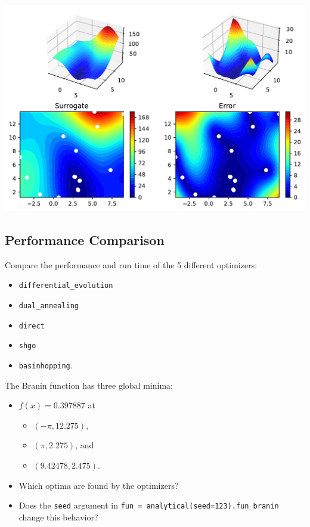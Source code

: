 \documentclass[
  letterpaper,
  DIV=11,
  numbers=noendperiod]{scrreprt}
\providecommand{\tightlist}{%
  \setlength{\itemsep}{0pt}\setlength{\parskip}{0pt}}\usepackage{longtable,booktabs,array}
\begin{document}
\begin{tcolorbox}
\includegraphics{004_spot_sklearn_optimization_files/figure-pdf/cell-12-output-3.pdf}

\end{tcolorbox}

\subsection{Performance Comparison}\label{performance-comparison}

Compare the performance and run time of the 5 different optimizers:

\begin{itemize}
\tightlist
\item
  \texttt{differential\_evolution}
\item
  \texttt{dual\_annealing}
\item
  \texttt{direct}
\item
  \texttt{shgo}
\item
  \texttt{basinhopping}.
\end{itemize}

The Branin function has three global minima:

\begin{itemize}
\tightlist
\item
  \(f(x) = 0.397887\) at

  \begin{itemize}
  \tightlist
  \item
    \((-\pi, 12.275)\),
  \item
    \((\pi, 2.275)\), and
  \item
    \((9.42478, 2.475)\).\\
  \end{itemize}
\item
  Which optima are found by the optimizers?
\item
  Does the \texttt{seed} argument in
  \texttt{fun\ =\ analytical(seed=123).fun\_branin} change this
  behavior?
\end{itemize}
\end{document}
